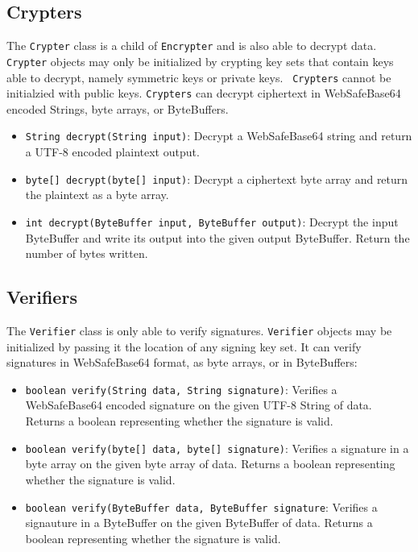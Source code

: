 \documentclass{llncs}
\begin{document}
\subsection{Crypters}

The {\tt Crypter} class is a child of {\tt Encrypter} and is also able to
decrypt data. {\tt Crypter} objects may only be initialized by crypting key sets
that contain keys able to decrypt, namely symmetric keys or private keys. {\tt
Crypters} cannot be initialzied with public keys. {\tt Crypters} can decrypt
ciphertext in WebSafeBase64 encoded Strings, byte arrays, or ByteBuffers.
\begin{itemize}
  \item {\tt String decrypt(String input)}: Decrypt a WebSafeBase64 string and
  return a UTF-8 encoded plaintext output.
  \item {\tt byte[] decrypt(byte[] input)}: Decrypt a ciphertext byte array and
  return the plaintext as a byte array.
  \item {\tt int decrypt(ByteBuffer input, ByteBuffer output)}: Decrypt the
  input ByteBuffer and write its output into the given output ByteBuffer.
  Return the number of bytes written.
\end{itemize}

\subsection{Verifiers}

The {\tt Verifier} class is only able to verify signatures. {\tt Verifier}
objects may be initialized by passing it the location of any signing key set.
It can verify signatures in WebSafeBase64 format, as byte arrays, or in
ByteBuffers:
\begin{itemize}
  \item {\tt boolean verify(String data, String signature)}: Verifies a
  WebSafeBase64 encoded signature on the given UTF-8 String of data. Returns a
  boolean representing whether the signature is valid.
  \item {\tt boolean verify(byte[] data, byte[] signature)}: Verifies a
  signature in a byte array on the given byte array of data. Returns a
  boolean representing whether the signature is valid. 
  \item {\tt boolean verify(ByteBuffer data, ByteBuffer signature}: Verifies a
  signauture in a ByteBuffer on the given ByteBuffer of data. Returns a boolean
  representing whether the signature is valid.
\end{itemize}
\end{document}
